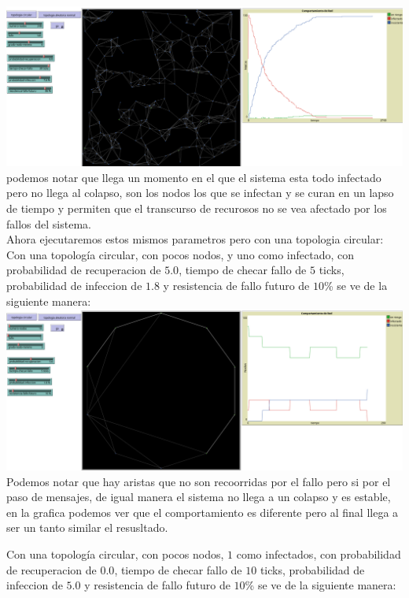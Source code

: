 \documentclass[12pt]{article}
\begin{document}
\textbf{\includegraphics[scale = 0.28]{images/images4.png}} podemos notar que llega un momento en el que el sistema esta todo infectado pero no llega al colapso, son los nodos los que se infectan y se curan en un lapso de tiempo y permiten que el transcurso de recurosos no se vea afectado por los fallos del sistema.\\


Ahora ejecutaremos estos mismos parametros pero con una topologia circular:\\


Con una topología circular, con pocos nodos, y uno como infectado, con probabilidad de recuperacion de $5.0$, tiempo de checar fallo de $5$ ticks, probabilidad de infeccion de $1.8$ y resistencia de fallo futuro de $10$\% se ve de la siguiente manera:\\

\textbf{\includegraphics[scale = 0.28]{images/images5.png}} Podemos notar que hay aristas que no son recoorridas por el fallo pero si por el paso de mensajes, de igual manera el sistema no llega a un colapso y es estable, en la grafica podemos ver que el comportamiento es diferente pero al final llega a ser un tanto similar el resusltado.

Con una topología circular, con pocos nodos, $1$ como infectados, con probabilidad de recuperacion de $0.0$, tiempo de checar fallo de $10$ ticks, probabilidad de infeccion de $5.0$ y resistencia de fallo futuro de $10$\% se ve de la siguiente manera:\\
\end{document}

